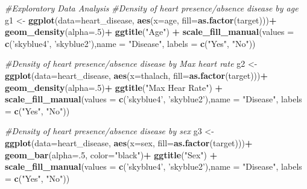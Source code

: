 \documentclass[]{article}
\newenvironment{Shaded}{\begin{snugshade}}{\end{snugshade}}
\newcommand{\KeywordTok}[1]{\textcolor[rgb]{0.13,0.29,0.53}{\textbf{#1}}}
\newcommand{\DataTypeTok}[1]{\textcolor[rgb]{0.13,0.29,0.53}{#1}}
\newcommand{\DecValTok}[1]{\textcolor[rgb]{0.00,0.00,0.81}{#1}}
\newcommand{\StringTok}[1]{\textcolor[rgb]{0.31,0.60,0.02}{#1}}
\newcommand{\CommentTok}[1]{\textcolor[rgb]{0.56,0.35,0.01}{\textit{#1}}}
\newcommand{\OperatorTok}[1]{\textcolor[rgb]{0.81,0.36,0.00}{\textbf{#1}}}
\newcommand{\NormalTok}[1]{#1}
\begin{document}
\begin{Shaded}
\begin{Highlighting}[]
\CommentTok{#Exploratory Data Analysis}
\CommentTok{#Density of heart presence/absence disease by age}
\NormalTok{g1 <-}\StringTok{ }\KeywordTok{ggplot}\NormalTok{(}\DataTypeTok{data=}\NormalTok{heart_disease, }\KeywordTok{aes}\NormalTok{(}\DataTypeTok{x=}\NormalTok{age, }\DataTypeTok{fill=}\KeywordTok{as.factor}\NormalTok{(target)))}\OperatorTok{+}
\StringTok{  }\KeywordTok{geom_density}\NormalTok{(}\DataTypeTok{alpha=}\NormalTok{.}\DecValTok{5}\NormalTok{)}\OperatorTok{+}
\StringTok{  }\KeywordTok{ggtitle}\NormalTok{(}\StringTok{"Age"}\NormalTok{) }\OperatorTok{+}
\StringTok{  }\KeywordTok{scale_fill_manual}\NormalTok{(}\DataTypeTok{values =} \KeywordTok{c}\NormalTok{(}\StringTok{'skyblue4'}\NormalTok{, }\StringTok{'skyblue2'}\NormalTok{),}\DataTypeTok{name =} \StringTok{"Disease"}\NormalTok{, }\DataTypeTok{labels =} \KeywordTok{c}\NormalTok{(}\StringTok{"Yes"}\NormalTok{, }\StringTok{"No"}\NormalTok{))}

\CommentTok{#Density of heart presence/absence disease by Max heart rate}
\NormalTok{g2 <-}\StringTok{ }\KeywordTok{ggplot}\NormalTok{(}\DataTypeTok{data=}\NormalTok{heart_disease, }\KeywordTok{aes}\NormalTok{(}\DataTypeTok{x=}\NormalTok{thalach, }\DataTypeTok{fill=}\KeywordTok{as.factor}\NormalTok{(target)))}\OperatorTok{+}
\StringTok{  }\KeywordTok{geom_density}\NormalTok{(}\DataTypeTok{alpha=}\NormalTok{.}\DecValTok{5}\NormalTok{)}\OperatorTok{+}
\StringTok{  }\KeywordTok{ggtitle}\NormalTok{(}\StringTok{"Max Hear Rate"}\NormalTok{) }\OperatorTok{+}
\StringTok{  }\KeywordTok{scale_fill_manual}\NormalTok{(}\DataTypeTok{values =} \KeywordTok{c}\NormalTok{(}\StringTok{'skyblue4'}\NormalTok{, }\StringTok{'skyblue2'}\NormalTok{),}\DataTypeTok{name =} \StringTok{"Disease"}\NormalTok{, }\DataTypeTok{labels =} \KeywordTok{c}\NormalTok{(}\StringTok{"Yes"}\NormalTok{, }\StringTok{"No"}\NormalTok{))}

\CommentTok{#Density of heart presence/absence disease by sex}
\NormalTok{g3 <-}\StringTok{ }\KeywordTok{ggplot}\NormalTok{(}\DataTypeTok{data=}\NormalTok{heart_disease, }\KeywordTok{aes}\NormalTok{(}\DataTypeTok{x=}\NormalTok{sex, }\DataTypeTok{fill=}\KeywordTok{as.factor}\NormalTok{(target)))}\OperatorTok{+}
\StringTok{      }\KeywordTok{geom_bar}\NormalTok{(}\DataTypeTok{alpha=}\NormalTok{.}\DecValTok{5}\NormalTok{, }\DataTypeTok{color=}\StringTok{"black"}\NormalTok{)}\OperatorTok{+}
\StringTok{      }\KeywordTok{ggtitle}\NormalTok{(}\StringTok{"Sex"}\NormalTok{) }\OperatorTok{+}
\StringTok{      }\KeywordTok{scale_fill_manual}\NormalTok{(}\DataTypeTok{values =} \KeywordTok{c}\NormalTok{(}\StringTok{'skyblue4'}\NormalTok{, }\StringTok{'skyblue2'}\NormalTok{),}\DataTypeTok{name =} \StringTok{"Disease"}\NormalTok{, }\DataTypeTok{labels =} \KeywordTok{c}\NormalTok{(}\StringTok{"Yes"}\NormalTok{, }\StringTok{"No"}\NormalTok{))}


\end{Highlighting}
\end{Shaded}
\end{document}

